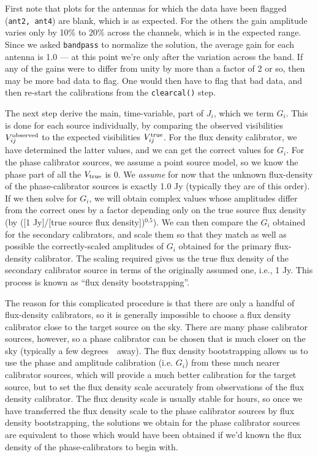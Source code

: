 \documentclass[force,almostfull,justified]{tufte-book}
\begin{document}
First note that plots for the antennas for which the data have been flagged ({\tt ant2, ant4}) are
blank, which is as expected.  For the others the gain amplitude varies only by 10\% to 20\% across the
channels, which is in the expected range.  Since we asked {\tt bandpass} to normalize the solution,
the average gain for each antenna is 1.0 --- at this point we're only after the variation across the
band.  If any of the gains were to differ from unity by more than a factor of 2 or so, then may be
more bad data to flag.  One would then have to flag that bad data, and then re-start the calibrations
from the {\tt clearcal()} step.

The next step derive the main, time-variable, part of $J_i$, which we term $G_i$.  This is done for
each source individually, by comparing the observed visibilities $V_{ij}^{\rm observed}$ to the
expected visibilities $V_{ij}^{\rm true}$.  For the flux density calibrator, we have determined the
latter values, and we can get the correct values for $G_i$.  For the phase calibrator sources, we
assume a point source model, so we know the phase part of all the $V_{\rm true}$ is 0.  We {\em
assume} for now that the unknown flux-density of the phase-calibrator sources is exactly 1.0 Jy
(typically they are of this order). If we then solve for $G_i$, we will obtain complex values whose
amplitudes differ from the correct ones by a factor depending only on the true source flux density (by
([1 Jy]/[true source flux density])$^{0.5}$).  We can then compare the $G_i$ obtained for the
secondary calibrators, and scale them so that they match as well as possible the correctly-scaled
amplitudes of $G_i$ obtained for the primary flux-density calibrator.  The scaling required gives us
the true flux density of the secondary calibrator source in terms of the originally assumed one, i.e.,
1 Jy.  This process is known as ``flux density bootstrapping''.

The reason for this complicated procedure is that there are only a handful of flux-density
calibrators, so it is generally impossible to choose a flux density calibrator close to the target
source on the sky.  There are many phase calibrator sources, however, so a phase calibrator can be
chosen that is much closer on the sky (typically a few degrees~\arcdeg\ away).  The flux density
bootstrapping allows us to use the phase and amplitude calibration (i.e. $G_i$) from these much nearer
calibrator sources, which will provide a much better calibration for the target source, but to set the
flux density scale accurately from observations of the flux density calibrator.  The flux density
scale is usually stable for hours, so once we have transferred the flux density scale to the phase
calibrator sources by flux density bootstrapping, the solutions we obtain for the phase calibrator
sources are equivalent to those which would have been obtained if we'd known the flux density of the
phase-calibrators to begin with.
\end{document}
